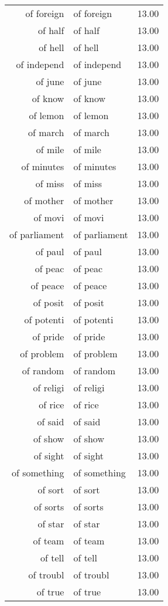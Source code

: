 \begin{table}[ht]
\begin{tabular}{rlr}
  of foreign & of foreign & 13.00 \\ 
  of half & of half & 13.00 \\ 
  of hell & of hell & 13.00 \\ 
  of independ & of independ & 13.00 \\ 
  of june & of june & 13.00 \\ 
  of know & of know & 13.00 \\ 
  of lemon & of lemon & 13.00 \\ 
  of march & of march & 13.00 \\ 
  of mile & of mile & 13.00 \\ 
  of minutes & of minutes & 13.00 \\ 
  of miss & of miss & 13.00 \\ 
  of mother & of mother & 13.00 \\ 
  of movi & of movi & 13.00 \\ 
  of parliament & of parliament & 13.00 \\ 
  of paul & of paul & 13.00 \\ 
  of peac & of peac & 13.00 \\ 
  of peace & of peace & 13.00 \\ 
  of posit & of posit & 13.00 \\ 
  of potenti & of potenti & 13.00 \\ 
  of pride & of pride & 13.00 \\ 
  of problem & of problem & 13.00 \\ 
  of random & of random & 13.00 \\ 
  of religi & of religi & 13.00 \\ 
  of rice & of rice & 13.00 \\ 
  of said & of said & 13.00 \\ 
  of show & of show & 13.00 \\ 
  of sight & of sight & 13.00 \\ 
  of something & of something & 13.00 \\ 
  of sort & of sort & 13.00 \\ 
  of sorts & of sorts & 13.00 \\ 
  of star & of star & 13.00 \\ 
  of team & of team & 13.00 \\ 
  of tell & of tell & 13.00 \\ 
  of troubl & of troubl & 13.00 \\ 
  of true & of true & 13.00 \\ 

\end{tabular}
\end{table}

